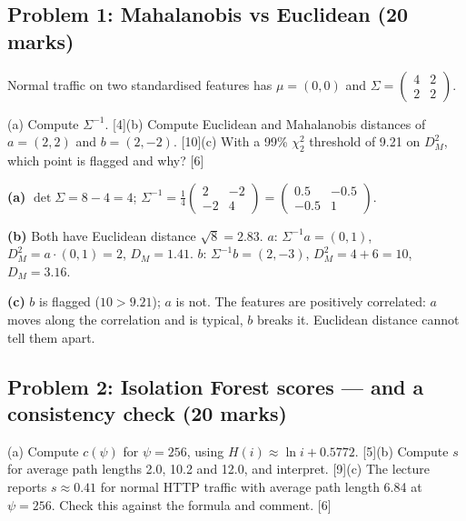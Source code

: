 \documentclass[11pt]{article}
\begin{document}
\subsection{Problem 1: Mahalanobis vs Euclidean \normalfont\small\color{GreyN}(20 marks)}

\begin{prob}Normal traffic on two standardised features has $\mu=(0,0)$ and $\Sigma=\begin{pmatrix}4&2\\2&2\end{pmatrix}$.

(a) Compute $\Sigma^{-1}$. [4]\newline (b) Compute Euclidean and Mahalanobis distances of $a=(2,2)$ and $b=(2,-2)$. [10]\newline (c) With a 99\% $\chi^2_2$ threshold of 9.21 on $D_M^2$, which point is flagged and why? [6]\end{prob}

\begin{soln}\textbf{(a)} $\det\Sigma=8-4=4$; $\Sigma^{-1}=\tfrac14\begin{pmatrix}2&-2\\-2&4\end{pmatrix}=\begin{pmatrix}0.5&-0.5\\-0.5&1\end{pmatrix}$.

\textbf{(b)} Both have Euclidean distance $\sqrt8=2.83$. $a$: $\Sigma^{-1}a=(0,1)$, $D_M^2=a\cdot(0,1)=2$, $D_M=\mathbf{1.41}$. $b$: $\Sigma^{-1}b=(2,-3)$, $D_M^2=4+6=10$, $D_M=\mathbf{3.16}$.

\textbf{(c)} $b$ is flagged ($10>9.21$); $a$ is not. The features are positively correlated: $a$ moves along the correlation and is typical, $b$ breaks it. Euclidean distance cannot tell them apart.\end{soln}

\subsection{Problem 2: Isolation Forest scores --- and a consistency check \normalfont\small\color{GreyN}(20 marks)}

\begin{prob}(a) Compute $c(\psi)$ for $\psi=256$, using $H(i)\approx\ln i+0.5772$. [5]\newline (b) Compute $s$ for average path lengths 2.0, 10.2 and 12.0, and interpret. [9]\newline (c) The lecture reports $s\approx0.41$ for normal HTTP traffic with average path length 6.84 at $\psi=256$. Check this against the formula and comment. [6]\end{prob}
\end{document}
